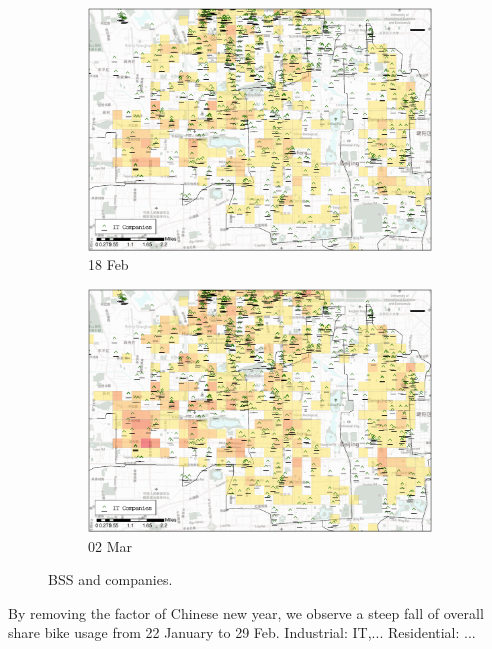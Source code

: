 \documentclass[preprints,ijgi,submit,moreauthors]{Definitions/mdpi}
\begin{document}
\begin{figure}[H]
    \vspace{6pt}
    \begin{subfigure}{.45\textwidth}
        \includegraphics[width=\textwidth]{Figures/Relation_with_POIs/POI_compD2020_02_18.eps}
        \caption{18 Feb}
    \end{subfigure}
        \begin{subfigure}{.45\textwidth}
        \includegraphics[width=\textwidth]{Figures/Relation_with_POIs/POI_compD2020_03_02.eps}
        \caption{02 Mar}
    \end{subfigure}
    \caption{BSS and companies.}
    \label{fig:BSS_companies}
\end{figure}

By removing the factor of Chinese new year, we observe a steep fall of overall share bike usage from 22 January to 29 Feb.
Industrial: IT,...
Residential: ...
\end{document}
